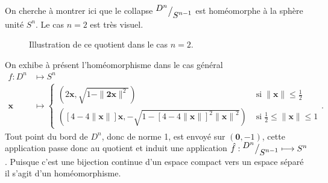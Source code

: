 \documentclass[main.tex]{subfiles}
\begin{document}
	\begin{example}
		On cherche à montrer ici que le collapse ${^{\textstyle D^n}\big/_{\textstyle S^{n-1}}}$ est homéomorphe à la sphère unité $S^n$. Le cas $n=2$ est très visuel.
		\begin{figure}[ht!]
			\centering
			\caption{Illustration de ce quotient dans le cas $n=2$.}
		\end{figure}
		On exhibe à présent l'homéomorphisme dans le cas général
		\begin{align*}
			f : D^n &\longmapsto S^n \\
			\textbf{x} &\longmapsto \begin{cases}
				(2\textbf{x},\sqrt{1-\|\textbf{2x}\|^2}) \; &\text{si} \; \|\textbf{x}\| \le \frac{1}{2} \\
				([4-4\|\textbf{x}\|]\textbf{x},-\sqrt{1-{[4-4\|\textbf{x}\|]}^2{\|\textbf{x}\|}^2}) \; &\text{si} \; \frac{1}{2} \le \|\textbf{x}\| \le 1
			\end{cases}
		.\end{align*}
		Tout point du bord de $D^n$, donc de norme 1, est envoyé sur  $(\textbf{0},-1)$, cette application passe donc au quotient et induit une application $\hat{f} : {^{\textstyle D^n}\big/_{\textstyle S^{n-1}}} \longmapsto S^n$. Puisque c'est une bijection continue d'un espace compact vers un espace séparé il s'agit d'un homéomorphisme.
	\end{example}
\end{document}
